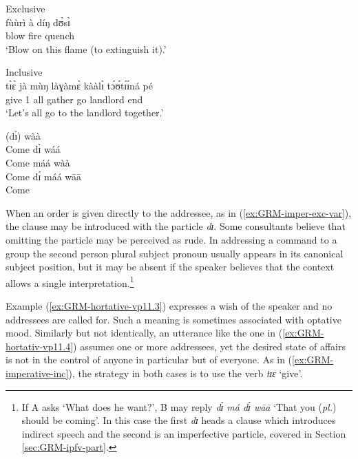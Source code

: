 \ea\label{ex:GRM-imperative-exc-inc}

\ea\label{ex:GRM-imperative-exc}{\rm Exclusive}\\
\gll fùùrì à díŋ dʊ̀sɪ̀\\
blow {\art} fire quench\\
\glt `Blow on this flame (to extinguish it).'

\ex\label{ex:GRM-imperative-inc}{\rm Inclusive}\\
\gll tɪ̀ɛ̀ jà mùŋ làɣàmɛ̀ kààlɪ̀ tɔ́ʊ́tɪ́ɪ́ná  pé \\
give {1\pl} all gather go landlord end\\
\glt `Let's all go to the landlord  together.'

\z
\z

\par
[redo]
\par


\begin{multicols}{2}
 

\ea\label{ex:GRM-imper-exc-var}
\ea\label{ex:GRM-imper-exc-var-sg} (dɪ̀)  wàà\\
Come
\ex\label{ex:GRM-imper}  dɪ̀ wáá\\
Come
\ex\label{ex:GRM-imper}  máá wàà\\
Come
\ex\label{ex:GRM-imper-exc-var-out}  dɪ́ máá wāā\\
Come
\z
\z

\end{multicols}



When an order is given directly to the addressee, as in 
(\ref{ex:GRM-imper-exc-var}), the clause may be 
introduced with the
 particle {\it dɪ}. Some consultants believe that omitting the
particle may
be perceived as rude. In addressing a command to a group the
second person plural subject pronoun  usually appears in its canonical subject
position, but it may be absent if the speaker believes that the context allows a
single interpretation.\footnote{ If A asks `What does he want?', B may reply
{\it dɪ́  má dɪ́ wāā} `That you ({\it pl.}) should be coming'. In this 
case the first {\it dɪ}
heads a  clause which introduces indirect speech and the second is an 
imperfective particle,  covered in Section \ref{sec:GRM-ipfv-part}. }

Example (\ref{ex:GRM-hortative-vp11.3}) expresses a wish of the speaker and no
addressees are called for. Such a meaning is sometimes associated with 
 optative
mood. Similarly but not  identically,  an utterance like the one in
(\ref{ex:GRM-hortativ-vp11.4})  assumes one or more addressees, yet the desired
state of affairs is not in the control of anyone in particular but of everyone. 
 As in (\ref{ex:GRM-imperative-inc}), the  strategy in both cases is
to use the verb {\it tɪɛ} `give'.  
% 

